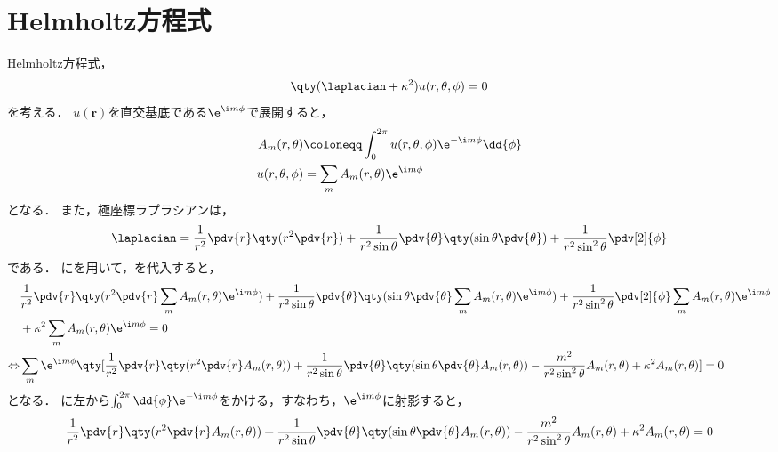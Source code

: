 \documentclass{report}
\begin{document}
    \section{Helmholtz方程式}
      Helmholtz方程式，
      \begin{align}
        \qty(\laplacian + \kappa^2)u(r, \theta, \phi) = 0\label{helmholtz-eq-wave}
      \end{align}
      を考える．
      $u(\bm{r})$を直交基底である$\e^{\i m\phi}$で展開すると，
      \begin{align}
        A_m(r, \theta) &\coloneqq \int_{0}^{2\pi}u(r, \theta, \phi)\e^{-\i m\phi}\dd{\phi} \\ 
        u(r, \theta, \phi) &= \sum_{m}A_m(r, \theta)\e^{\i m\phi}\label{u-expand-with-a} \\ 
      \end{align}
      となる．
      また，極座標ラプラシアンは，
      \begin{align}
        \laplacian = \frac{1}{r^2}\pdv{r}\qty(r^2\pdv{r}) + \frac{1}{r^2\sin\theta}\pdv{\theta}\qty(\sin\theta\pdv{\theta}) + \frac{1}{r^2\sin^2\theta}\pdv[2]{\phi} \label{polar-laplacian}
      \end{align}
      である．
      にを用いて，を代入すると，
      \begin{align}
        &\frac{1}{r^2}\pdv{r}\qty(r^2\pdv{r}\sum_{m}A_m(r, \theta)\e^{\i m\phi}) + \frac{1}{r^2\sin\theta}\pdv{\theta}\qty(\sin\theta\pdv{\theta}\sum_{m}A_m(r, \theta)\e^{\i m\phi}) + \frac{1}{r^2\sin^2\theta}\pdv[2]{\phi}\sum_{m}A_m(r, \theta)\e^{\i m\phi} \notag \\ 
        &+ \kappa^2\sum_{m}A_m(r, \theta)\e^{\i m\phi} = 0 \\ 
        \Leftrightarrow &\sum_{m}\e^{\i m\phi}\qty[
          \frac{1}{r^2}\pdv{r}\qty(r^2\pdv{r}A_m(r, \theta)) + 
          \frac{1}{r^2\sin\theta}\pdv{\theta}\qty(\sin\theta\pdv{\theta}A_m(r, \theta)) 
          - \frac{m^2}{r^2\sin^2\theta}A_m(r, \theta) + \kappa^2A_m(r, \theta)
        ] = 0 \label{am-before-int}
      \end{align}
      となる．
      に左から$\int_{0}^{2\pi}\dd{\phi}\e^{-\i m\phi}$をかける，すなわち，$\e^{\i m\phi}$に射影すると，
      \begin{align}
        \frac{1}{r^2}\pdv{r}\qty(r^2\pdv{r}A_m(r, \theta)) + \frac{1}{r^2\sin\theta}\pdv{\theta}\qty(\sin\theta\pdv{\theta}A_m(r, \theta)) - \frac{m^2}{r^2\sin^2\theta}A_m(r, \theta) + \kappa^2A_m(r, \theta) = 0 \label{a-condition}
      \end{align}
\end{document}
